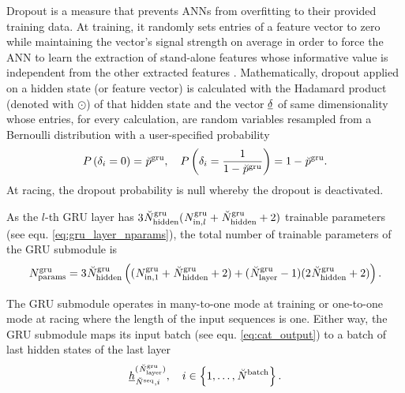 Dropout is a measure that prevents ANNs from overfitting 
to their provided training data.
At training, 
it randomly sets entries of a feature vector to zero 
while maintaining the vector's signal strength on average
in order to force the ANN to learn the extraction of stand-alone features 
whose informative value is independent from the other extracted features \cite{Hinton2012}.
Mathematically, dropout applied on a hidden state (or feature vector)
is calculated with the Hadamard product (denoted with $\odot$)
of that hidden state and the vector $\GRUDropout$ of same dimensionality 
whose entries, for every calculation, 
are random variables resampled 
from a Bernoulli distribution
with a user-specified probability
\begin{equation}
    P \left( \delta_i = 0 \right) = \GRUDropoutP
    ,\quad
    P \left( \delta_i = \frac{1}{1-\GRUDropoutP} \right) = 1 - \GRUDropoutP
    .
\end{equation}
At racing, the dropout probability is null
whereby the dropout is deactivated.

As the $l$-th GRU layer has $3\GRUHiddenSize (\GRUInp{l} + \GRUHiddenSize + 2)$
trainable parameters (see equ. \ref{eq:gru_layer_nparams}),
the total number of trainable parameters of the GRU submodule is
\begin{align}
    \GRUNumP = 3\GRUHiddenSize \tuple{
        (\GRUInp{1} + \GRUHiddenSize + 2)
        + 
        (\GRUNumLayer -1)
        (2\GRUHiddenSize + 2)
    }.
\end{align}

The GRU submodule operates in many-to-one mode at training or 
one-to-one mode at racing where the length of the input sequences is one.
Either way, the GRU submodule maps its input batch
(see equ. \ref{eq:cat_output})
to a batch of last hidden states of the last layer
\begin{equation}
    \hiddenstate[]{(\GRUNumLayer)}{\seqLen, i}{}{}
    , \quad i \in \setOfInts{1, \dots, \batchSize}
    .
\end{equation}




